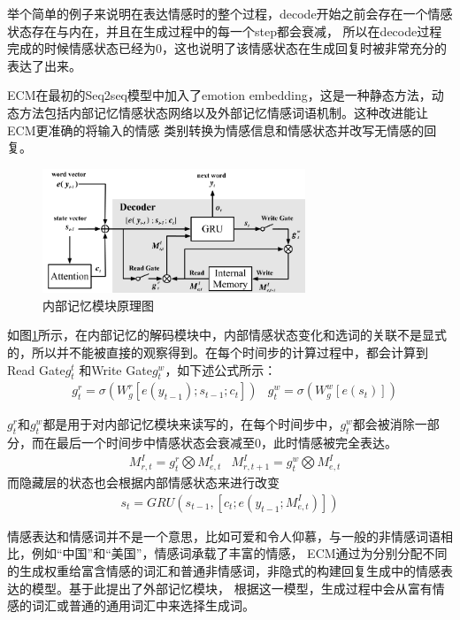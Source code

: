 \documentclass[supercite]{HustGraduPaper}
\theoremstyle{definition}
\begin{document}
举个简单的例子来说明在表达情感时的整个过程，decode开始之前会存在一个情感状态存在与内在，并且在生成过程中的每一个step都会衰减，
所以在decode过程完成的时候情感状态已经为0，这也说明了该情感状态在生成回复时被非常充分的表达了出来。

ECM在最初的Seq2seq模型中加入了emotion embedding，这是一种静态方法，动态方法包括内部记忆情感状态网络以及外部记忆情感词语机制。这种改进能让ECM更准确的将输入的情感
类别转换为情感信息和情感状态并改写无情感的回复。
\begin{figure}[H] %
  \centering %
  \includegraphics[width=0.7\textwidth]{images/imemory.png} %
  \caption{内部记忆模块原理图} %
  \label{Fig.imemory} %
\end{figure}

如图\ref{Fig.imemory}所示，在内部记忆的解码模块中，内部情感状态变化和选词的关联不是显式的，所以并不能被直接的观察得到。在每个时间步的计算过程中，都会计算到Read Gate$g_t^t$
和Write Gate$g_t^w$，如下述公式所示：
\begin{align}
  &g_t^r = \sigma(W_g^r[e(y_{t-1});s_{t-1};c_t])
  &g_t^w = \sigma(W_g^w[e(s_t)])
\end{align}

$g_t^r$和$g_t^w$都是用于对内部记忆模块来读写的，在每个时间步中，$g_t^w$都会被消除一部分，而在最后一个时间步中情感状态会衰减至0，此时情感被完全表达。
\begin{align}
  &M_{r,t}^I = g_t^r \bigotimes M_{e,t}^I
  &M_{r,t+1}^I = g_t^w \bigotimes M_{e,t}^I
\end{align}
而隐藏层的状态也会根据内部情感状态来进行改变
\begin{align}
  s_t = GRU(s_{t-1},[c_t;e(y_{t-1};M_{e,t}^I)])
\end{align}

情感表达和情感词并不是一个意思，比如可爱和令人仰慕，与一般的非情感词语相比，例如“中国”和“美国”，情感词承载了丰富的情感，
ECM通过为分别分配不同的生成权重给富含情感的词汇和普通非情感词，非隐式的构建回复生成中的情感表达的模型。基于此提出了外部记忆模块，
根据这一模型，生成过程中会从富有情感的词汇或普通的通用词汇中来选择生成词。
\end{document}
